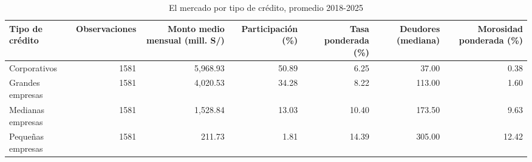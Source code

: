 \begin{table}[htbp]
\caption{El mercado por tipo de crédito, promedio 2018-2025}
\label{tab:portipo}
\begin{tabular}{lrrrrrr}
\toprule
Tipo de crédito & Observaciones & Monto medio mensual (mill. S/) & Participación (\%) & Tasa ponderada (\%) & Deudores (mediana) & Morosidad ponderada (\%) \\
\midrule
Corporativos & 1581 & 5,968.93 & 50.89 & 6.25 & 37.00 & 0.38 \\
Grandes empresas & 1581 & 4,020.53 & 34.28 & 8.22 & 113.00 & 1.60 \\
Medianas empresas & 1581 & 1,528.84 & 13.03 & 10.40 & 173.50 & 9.63 \\
Pequeñas empresas & 1581 & 211.73 & 1.81 & 14.39 & 305.00 & 12.42 \\
\bottomrule
\end{tabular}
\end{table}
